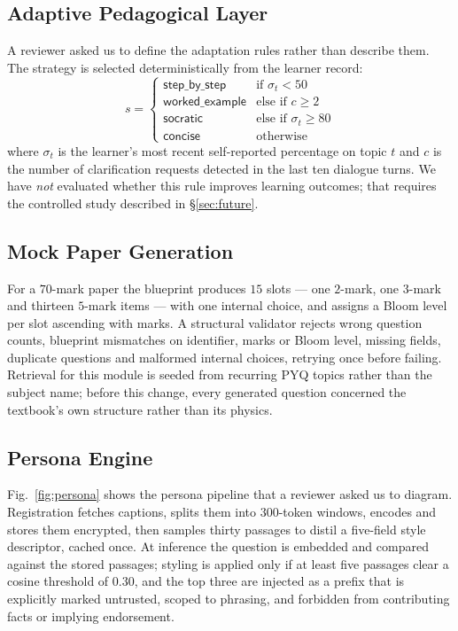 \documentclass[conference]{IEEEtran}
\begin{document}
\subsection{Adaptive Pedagogical Layer}
\label{sec:adaptive}
A reviewer asked us to define the adaptation rules rather than describe them.
The strategy is selected deterministically from the learner record:
\begin{equation}
s =
\begin{cases}
\textsf{step\_by\_step} & \text{if } \sigma_t < 50\\
\textsf{worked\_example} & \text{else if } c \geq 2\\
\textsf{socratic} & \text{else if } \sigma_t \geq 80\\
\textsf{concise} & \text{otherwise}
\end{cases}
\end{equation}
where $\sigma_t$ is the learner's most recent self-reported percentage on topic
$t$ and $c$ is the number of clarification requests detected in the last ten
dialogue turns. We have \emph{not} evaluated whether this rule improves learning
outcomes; that requires the controlled study described in §\ref{sec:future}.

\subsection{Mock Paper Generation}
For a $70$-mark paper the blueprint produces $15$ slots --- one $2$-mark, one
$3$-mark and thirteen $5$-mark items --- with one internal choice, and assigns a
Bloom level per slot ascending with marks. A structural validator rejects wrong
question counts, blueprint mismatches on identifier, marks or Bloom level,
missing fields, duplicate questions and malformed internal choices, retrying once
before failing. Retrieval for this module is seeded from recurring PYQ topics
rather than the subject name; before this change, every generated question
concerned the textbook's own structure rather than its physics.

\subsection{Persona Engine}
\label{sec:persona}
Fig.~\ref{fig:persona} shows the persona pipeline that a reviewer asked us to
diagram. Registration fetches captions, splits them into $300$-token windows,
encodes and stores them encrypted, then samples thirty passages to distil a
five-field style descriptor, cached once. At inference the question is embedded
and compared against the stored passages; styling is applied only if at least
five passages clear a cosine threshold of $0.30$, and the top three are injected
as a prefix that is explicitly marked untrusted, scoped to phrasing, and
forbidden from contributing facts or implying endorsement.
\end{document}
